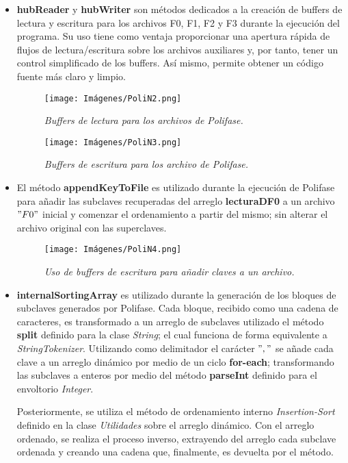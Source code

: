 \documentclass[letterpaper,12pt]{extarticle}
\begin{document}
\begin{itemize}
\item \textbf{hubReader} y \textbf{hubWriter} son métodos dedicados a la creación de buffers de lectura y escritura para los archivos F0, F1, F2 y F3 durante la ejecución del programa. Su uso tiene como ventaja proporcionar una apertura rápida de flujos de lectura/escritura sobre los archivos auxiliares y, por tanto, tener un control simplificado de los buffers. Así mismo, permite obtener un código fuente más claro y limpio. 

\begin{figure}[h!]
\centering
\texttt{[image: Imágenes/PoliN2.png]}
\caption{\textit{Buffers de lectura para los archivos de Polifase.}}
\label{fig:PoliN2}
\end{figure}

\begin{figure}[h!]
\centering
\texttt{[image: Imágenes/PoliN3.png]}
\caption{\textit{Buffers de escritura para los archivo de Polifase.}}
\label{fig:PoliN3}
\end{figure}

\item El método \textbf{appendKeyToFile} es utilizado durante la ejecución de Polifase para añadir las subclaves recuperadas del arreglo \textbf{lecturaDF0} a un archivo $"F0"$ inicial y comenzar el ordenamiento a partir del mismo; sin alterar el archivo original con las superclaves. 

\begin{figure}[h!]
\centering
\texttt{[image: Imágenes/PoliN4.png]}
\caption{\textit{Uso de buffers de escritura para añadir claves a un archivo.}}
\label{fig:PoliN4}
\end{figure}

\item \textbf{internalSortingArray} es utilizado durante la generación de los bloques de subclaves generados por Polifase. Cada bloque, recibido como una cadena de caracteres, es transformado a un arreglo de subclaves utilizado el método \textbf{split} definido para la clase \textit{String}; el cual funciona de forma equivalente a \textit{StringTokenizer}. Utilizando como delimitador el carácter $","$ se añade cada clave a un arreglo dinámico por medio de un ciclo \textbf{for-each}; transformando las subclaves a enteros por medio del método \textbf{parseInt} definido para el envoltorio \textit{Integer}.

Posteriormente, se utiliza el método de ordenamiento interno \textit{Insertion-Sort} definido en la clase \textit{Utilidades} sobre el arreglo dinámico. Con el arreglo ordenado, se realiza el proceso inverso, extrayendo del arreglo cada subclave ordenada y creando una cadena que, finalmente, es devuelta por el método.


\end{itemize}
\end{document}
